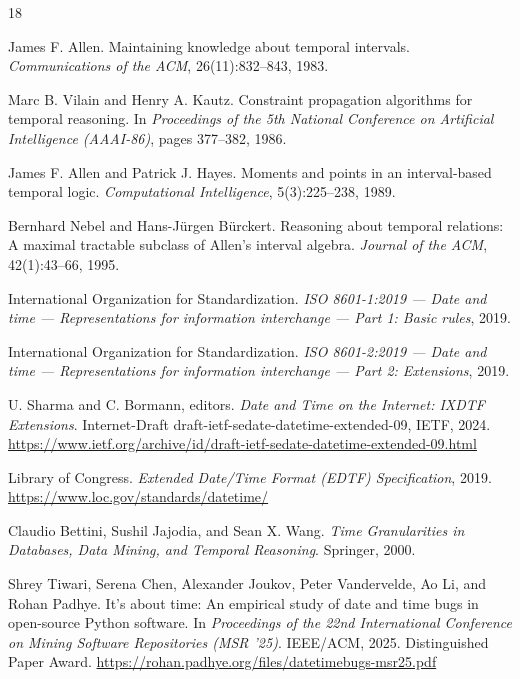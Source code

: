 \begin{thebibliography}{18}

  James F. Allen.
  \newblock Maintaining knowledge about temporal intervals.
  \newblock \emph{Communications of the ACM}, 26(11):832--843, 1983.
  \newblock {}

  Marc B. Vilain and Henry A. Kautz.
  \newblock Constraint propagation algorithms for temporal reasoning.
  \newblock In \emph{Proceedings of the 5th National Conference on
  Artificial Intelligence (AAAI-86)}, pages 377--382, 1986.

  James F. Allen and Patrick J. Hayes.
  \newblock Moments and points in an interval-based temporal logic.
  \newblock \emph{Computational Intelligence}, 5(3):225--238, 1989.
  \newblock {}

  Bernhard Nebel and Hans-J\"urgen B\"urckert.
  \newblock Reasoning about temporal relations: A maximal tractable
  subclass of Allen's interval algebra.
  \newblock \emph{Journal of the ACM}, 42(1):43--66, 1995.
  \newblock {}

  International Organization for Standardization.
  \newblock \emph{ISO 8601-1:2019 --- Date and time --- Representations
  for information interchange --- Part 1: Basic rules}, 2019.

  International Organization for Standardization.
  \newblock \emph{ISO 8601-2:2019 --- Date and time --- Representations
  for information interchange --- Part 2: Extensions}, 2019.

  U. Sharma and C. Bormann, editors.
  \newblock \emph{Date and Time on the Internet: IXDTF Extensions}.
  \newblock Internet-Draft draft-ietf-sedate-datetime-extended-09,
  IETF, 2024.
  \newblock \url{https://www.ietf.org/archive/id/draft-ietf-sedate-datetime-extended-09.html}

  Library of Congress.
  \newblock \emph{Extended Date/Time Format (EDTF) Specification}, 2019.
  \newblock \url{https://www.loc.gov/standards/datetime/}

  Claudio Bettini, Sushil Jajodia, and Sean X. Wang.
  \newblock \emph{Time Granularities in Databases, Data Mining, and
  Temporal Reasoning}.
  \newblock Springer, 2000.

  Shrey Tiwari, Serena Chen, Alexander Joukov, Peter Vandervelde,
  Ao Li, and Rohan Padhye.
  \newblock It's about time: An empirical study of date and time bugs
  in open-source Python software.
  \newblock In \emph{Proceedings of the 22nd International Conference
  on Mining Software Repositories (MSR '25)}. IEEE/ACM, 2025.
  \newblock Distinguished Paper Award.
  \newblock \url{https://rohan.padhye.org/files/datetimebugs-msr25.pdf}


\end{thebibliography}
